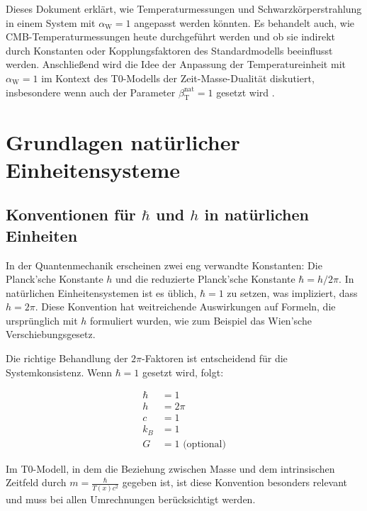 \documentclass[12pt,a4paper]{article}
\newcommand{\Tfield}{T(x)}
\newcommand{\betaT}{\beta_{\text{T}}}
\newcommand{\alphaW}{\alpha_{\text{W}}}
\begin{document}
	Dieses Dokument erklärt, wie Temperaturmessungen und Schwarzkörperstrahlung in einem System mit \(\alphaW = 1\) angepasst werden könnten. Es behandelt auch, wie \\CMB-Temperaturmessungen heute durchgeführt werden und ob sie indirekt durch Konstanten oder Kopplungsfaktoren des Standardmodells beeinflusst werden. Anschließend wird die Idee der Anpassung der Temperatureinheit mit \(\alphaW = 1\) im Kontext des T0-Modells der Zeit-Masse-Dualität \cite{pascher_galaxies_2025} diskutiert, insbesondere wenn auch der Parameter \(\betaT^{\text{nat}} = 1\) gesetzt wird \cite{pascher_params_2025}.
	
	\section{Grundlagen natürlicher Einheitensysteme}
	\label{sec:foundations}
	
	\subsection{Konventionen für \(\hbar\) und \(h\) in natürlichen Einheiten}
	\label{subsec:conventions}
	
	In der Quantenmechanik erscheinen zwei eng verwandte Konstanten: Die Planck'sche Konstante \(h\) und die reduzierte Planck'sche Konstante \(\hbar = h/2\pi\). In natürlichen Einheitensystemen ist es üblich, \(\hbar = 1\) zu setzen, was impliziert, dass \(h = 2\pi\). Diese Konvention hat weitreichende Auswirkungen auf Formeln, die ursprünglich mit \(h\) formuliert wurden, wie zum Beispiel das Wien'sche Verschiebungsgesetz.
	
	Die richtige Behandlung der \(2\pi\)-Faktoren ist entscheidend für die Systemkonsistenz. Wenn \(\hbar = 1\) gesetzt wird, folgt:
	
	\begin{tcolorbox}[colback=blue!5!white,colframe=blue!75!black,title=Konventionen in natürlichen Einheiten]
		\begin{align}
			\hbar &= 1 \\
			h &= 2\pi \\
			c &= 1 \\
			k_B &= 1 \\
			G &= 1 \text{ (optional)}
		\end{align}
	\end{tcolorbox}
	
	Im T0-Modell, in dem die Beziehung zwischen Masse und dem intrinsischen Zeitfeld durch \(m = \frac{\hbar}{\Tfield c^2}\) \cite{pascher_galaxies_2025} gegeben ist, ist diese Konvention besonders relevant und muss bei allen Umrechnungen berücksichtigt werden.
	
\end{document}
